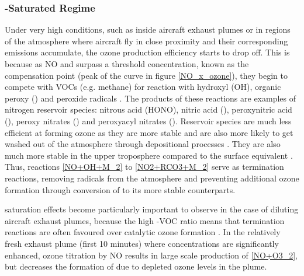 
\subsubsection{-Saturated Regime}
Under very high  conditions, such as inside aircraft exhaust plumes or in regions of the atmosphere where aircraft fly in close proximity and their corresponding emissions accumulate, the ozone production efficiency starts to drop off. This is because as NO and  surpass a threshold concentration, known as the compensation point (peak of the curve in figure \ref{NO_x_ozone}), they begin to compete with VOCs (e.g. methane) for reaction with hydroxyl (OH), organic peroxy () and peroxide  radicals \cite{Wasiuk2014}. The products of these reactions are examples of nitrogen reservoir species: nitrous acid (HONO), nitric acid (), peroxynitric acid (), peroxy nitrates () and peroxyacyl nitrates (). Reservoir species are much less efficient at forming ozone as they are more stable and are also more likely to get washed out of the atmosphere through depositional processes \cite{Jenkin2000}. They are also much more stable in the upper troposphere compared to the surface equivalent \cite{Khan2020}. Thus, reactions \eqref{NO+OH+M_2} to \eqref{NO2+RCO3+M_2} serve as termination reactions, removing radicals from the atmosphere and preventing additional ozone formation through conversion of  to its more stable counterparts.


 saturation effects become particularly important to observe in the case of diluting aircraft exhaust plumes, because the high -VOC ratio means that termination reactions are often favoured over catalytic ozone formation \cite{Song2003}. In the relatively fresh exhaust plume (first 10 minutes) where  concentrations are significantly enhanced, ozone titration by NO results in large scale production of  \eqref{NO+O3_2}, but decreases the formation of  due to depleted ozone levels in the plume.

